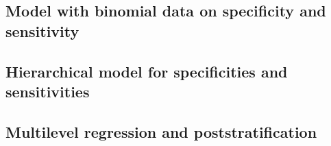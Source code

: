 \documentclass[11pt]{article}
\begin{document}
\subsection{Model with binomial data on specificity and sensitivity}\label{stan2}

\vspace{-\baselineskip}
\begin{small}
  \begin{quotation}\noindent
    
  \end{quotation}
\end{small}


\subsection{Hierarchical model for specificities and sensitivities}\label{stan3}

\vspace{-\baselineskip}
\begin{small}
  \begin{quotation}\noindent
    
  \end{quotation}
\end{small}

\subsection{Multilevel regression and poststratification}\label{stan4}

\vspace{-\baselineskip}
\begin{small}
  \begin{quotation}\noindent
    
  \end{quotation}
\end{small}
\end{document}
